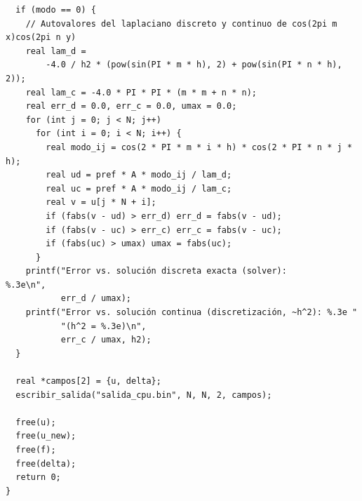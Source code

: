 \begin{appendix}
\begin{lstlisting}
  if (modo == 0) {
    // Autovalores del laplaciano discreto y continuo de cos(2pi m x)cos(2pi n y)
    real lam_d =
        -4.0 / h2 * (pow(sin(PI * m * h), 2) + pow(sin(PI * n * h), 2));
    real lam_c = -4.0 * PI * PI * (m * m + n * n);
    real err_d = 0.0, err_c = 0.0, umax = 0.0;
    for (int j = 0; j < N; j++)
      for (int i = 0; i < N; i++) {
        real modo_ij = cos(2 * PI * m * i * h) * cos(2 * PI * n * j * h);
        real ud = pref * A * modo_ij / lam_d;
        real uc = pref * A * modo_ij / lam_c;
        real v = u[j * N + i];
        if (fabs(v - ud) > err_d) err_d = fabs(v - ud);
        if (fabs(v - uc) > err_c) err_c = fabs(v - uc);
        if (fabs(uc) > umax) umax = fabs(uc);
      }
    printf("Error vs. solución discreta exacta (solver):        %.3e\n",
           err_d / umax);
    printf("Error vs. solución continua (discretización, ~h^2): %.3e "
           "(h^2 = %.3e)\n",
           err_c / umax, h2);
  }

  real *campos[2] = {u, delta};
  escribir_salida("salida_cpu.bin", N, N, 2, campos);

  free(u);
  free(u_new);
  free(f);
  free(delta);
  return 0;
}
\end{lstlisting}

\end{appendix}
